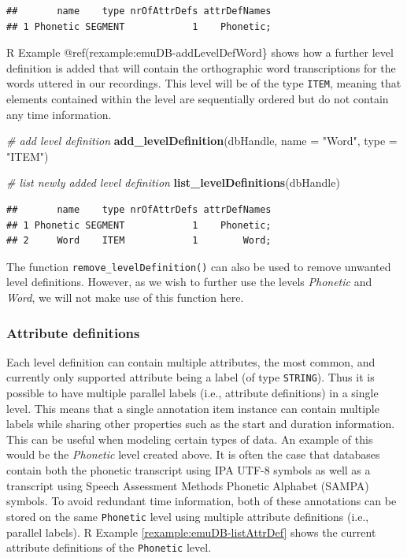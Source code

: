 \documentclass[]{book}
\newenvironment{Shaded}{\begin{snugshade}}{\end{snugshade}}
\newcommand{\CommentTok}[1]{\textcolor[rgb]{0.56,0.35,0.01}{\textit{#1}}}
\newcommand{\DataTypeTok}[1]{\textcolor[rgb]{0.13,0.29,0.53}{#1}}
\newcommand{\KeywordTok}[1]{\textcolor[rgb]{0.13,0.29,0.53}{\textbf{#1}}}
\newcommand{\NormalTok}[1]{#1}
\newcommand{\StringTok}[1]{\textcolor[rgb]{0.31,0.60,0.02}{#1}}
\theoremstyle{definition}
\theoremstyle{definition}
\theoremstyle{definition}
\theoremstyle{remark}
\begin{document}
\begin{verbatim}
##       name    type nrOfAttrDefs attrDefNames
## 1 Phonetic SEGMENT            1    Phonetic;
\end{verbatim}

R Example @ref(rexample:emuDB-addLevelDefWord\} shows how a further
level definition is added that will contain the orthographic word
transcriptions for the words uttered in our recordings. This level will
be of the type \texttt{ITEM}, meaning that elements contained within the
level are sequentially ordered but do not contain any time information.

\begin{Shaded}
\begin{Highlighting}[]
\CommentTok{# add level definition}
\KeywordTok{add_levelDefinition}\NormalTok{(dbHandle,}
                    \DataTypeTok{name =} \StringTok{"Word"}\NormalTok{,}
                    \DataTypeTok{type =} \StringTok{"ITEM"}\NormalTok{)}

\CommentTok{# list newly added level definition}
\KeywordTok{list_levelDefinitions}\NormalTok{(dbHandle)}
\end{Highlighting}
\end{Shaded}

\begin{verbatim}
##       name    type nrOfAttrDefs attrDefNames
## 1 Phonetic SEGMENT            1    Phonetic;
## 2     Word    ITEM            1        Word;
\end{verbatim}

The function \texttt{remove\_levelDefinition()} can also be used to
remove unwanted level definitions. However, as we wish to further use
the levels \emph{Phonetic} and \emph{Word}, we will not make use of this
function here.

\hypertarget{attribute-definitions}{%
\subsubsection{Attribute definitions}\label{attribute-definitions}}

Each level definition can contain multiple attributes, the most common,
and currently only supported attribute being a label (of type
\texttt{STRING}). Thus it is possible to have multiple parallel labels
(i.e., attribute definitions) in a single level. This means that a
single annotation item instance can contain multiple labels while
sharing other properties such as the start and duration information.
This can be useful when modeling certain types of data. An example of
this would be the \emph{Phonetic} level created above. It is often the
case that databases contain both the phonetic transcript using IPA UTF-8
symbols as well as a transcript using Speech Assessment Methods Phonetic
Alphabet (SAMPA) symbols. To avoid redundant time information, both of
these annotations can be stored on the same \texttt{Phonetic} level
using multiple attribute definitions (i.e., parallel labels). R Example
\ref{rexample:emuDB-listAttrDef} shows the current attribute definitions
of the \texttt{Phonetic} level.
\end{document}

